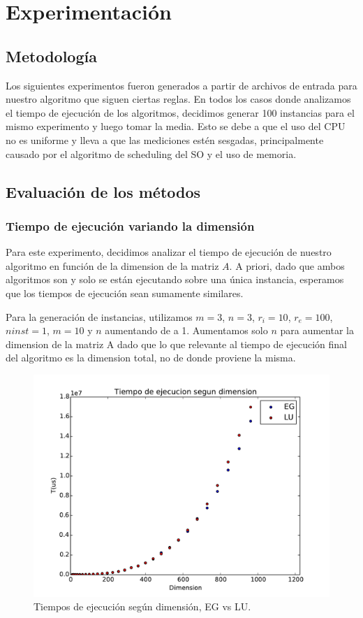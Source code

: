 \section{Experimentación}

\subsection{Metodología}

Los siguientes experimentos fueron generados a partir de archivos de entrada para nuestro algoritmo que siguen ciertas reglas. En todos los casos donde analizamos el tiempo de ejecución de los algoritmos, decidimos generar 100 instancias para el mismo experimento y luego tomar la media. Esto se debe a que el uso del CPU no es uniforme y lleva a que las mediciones estén sesgadas, principalmente causado por el algoritmo de scheduling del SO y el uso de memoria.

\subsection{Evaluación de los métodos}

\subsubsection{Tiempo de ejecución variando la dimensión}

Para este experimento, decidimos analizar el tiempo de ejecución de nuestro algoritmo en función de la dimension de la matriz $A$. A priori, dado que ambos algoritmos son  y solo se están ejecutando sobre una única instancia, esperamos que los tiempos de ejecución sean sumamente similares.

Para la generación de instancias, utilizamos $m = 3$, $n = 3$, $r_i = 10$, $r_e = 100$, $ninst = 1$, $m = 10$ y $n$ aumentando de a 1. Aumentamos solo $n$ para aumentar la dimension de la matriz A dado que lo que relevante al tiempo de ejecución final del algoritmo es la dimension total, no de donde proviene la misma.

\begin{figure}[h]
\centering
\includegraphics[scale=0.7]{graficos/dimVariable.pdf}
\caption{Tiempos de ejecución según dimensión, EG vs LU.}
\label{timeDim}
\end{figure}

